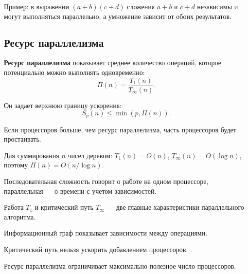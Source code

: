 Пример: в выражении $(a+b)(c+d)$ сложения $a+b$ и $c+d$ независимы и могут выполняться параллельно, а умножение зависит от обоих результатов.

\subsection*{Ресурс параллелизма}

\textbf{Ресурс параллелизма} показывает среднее количество операций, которое потенциально можно выполнять одновременно:
\[
\Pi(n)=\frac{T_1(n)}{T_\infty(n)}.
\]

Он задает верхнюю границу ускорения:
\[
S_p(n) \leq \min(p,\Pi(n)).
\]

Если процессоров больше, чем ресурс параллелизма, часть процессоров будет простаивать.

Для суммирования $n$ чисел деревом: $T_1(n)=O(n)$, $T_\infty(n)=O(\log n)$, поэтому $\Pi(n)=O(n/\log n)$.

\begin{important}
    \item Последовательная сложность говорит о работе на одном процессоре, параллельная --- о времени с учетом зависимостей.
    \item Работа $T_1$ и критический путь $T_\infty$ --- две главные характеристики параллельного алгоритма.
    \item Информационный граф показывает зависимости между операциями.
    \item Критический путь нельзя ускорить добавлением процессоров.
    \item Ресурс параллелизма ограничивает максимально полезное число процессоров.
\end{important}
